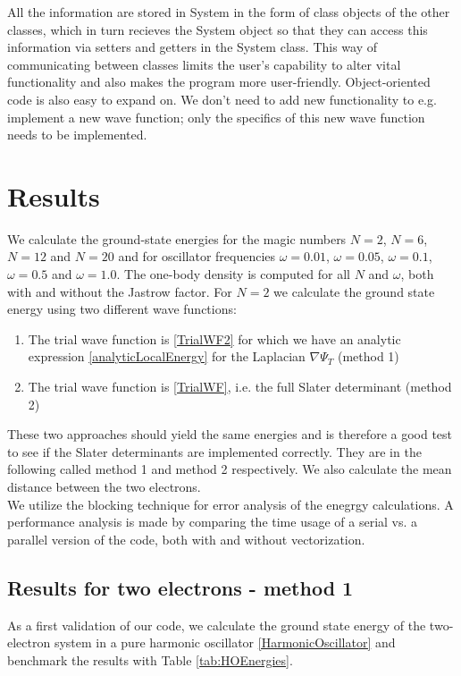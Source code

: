 \documentclass[english, a4paper]{article}
\begin{document}
\noindent All the information are stored in System in the form of class objects of the other classes, which in turn 
recieves the System object so that they can access this information via
setters and getters in the System class. This way of communicating between classes limits the user's 
capability to alter vital functionality and also makes the program more user-friendly. 
Object-oriented code is also easy to expand on. We don't need to add new functionality to
e.g. implement a new wave function; only the specifics of this new wave function needs to be implemented. 


\section{Results}

We calculate the ground-state energies for the magic numbers $N = 2$, $N=6$, $N=12$ and $N=20$
and for oscillator frequencies
$\omega = 0.01$, $\omega = 0.05$, $\omega = 0.1$, $\omega = 0.5$ and $\omega = 1.0$. 
The one-body density is computed for all $N$ and $\omega$, both with and without the Jastrow factor. 
For $N=2$ we calculate the ground state energy using two different wave functions:
\begin{enumerate}
 \item The trial wave function is \eqref{TrialWF2} for which we have an analytic
 expression \eqref{analyticLocalEnergy} for the Laplacian $\nabla \Psi_T$ (method 1)
 \item The trial wave function is \eqref{TrialWF}, i.e. the full Slater determinant (method 2)
\end{enumerate}
These two approaches should yield the same energies and is therefore a good test to see
if the Slater determinants are implemented correctly. They are in the following called method 1 and method 2
respectively. We also calculate the mean distance between the two electrons. \\

\noindent
We utilize the blocking technique for error analysis of the enegrgy calculations. A performance analysis
is made by comparing the time usage of a serial vs. a parallel version of the code, both with and without
vectorization. 

\subsection{Results for two electrons - method 1}
As a first validation of our code, we calculate the ground state energy of the two-electron system
in a pure harmonic oscillator \eqref{HarmonicOscillator} and benchmark the results with Table \eqref{tab:HOEnergies}.
\end{document}
